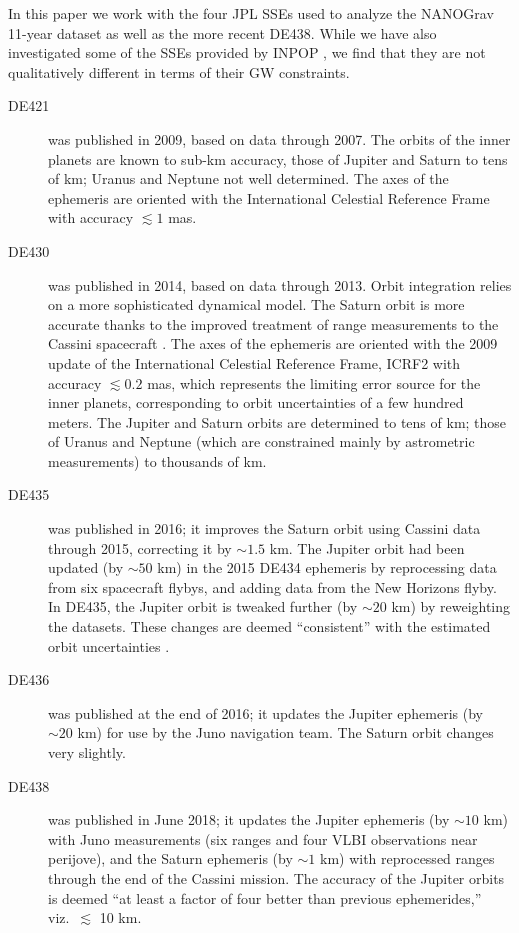 \documentclass{aastex63}
\begin{document}
In this paper we work with the four JPL SSEs used to analyze the NANOGrav 11-year dataset \citep{2018ApJ...859...47A} as well as the more recent DE438. While we have also investigated some of the SSEs provided by INPOP \citep{inpop13,inpop17}, we find that they are not qualitatively different in terms of their GW constraints.
%
\begin{description}
%
\item[DE421 \citep{2009IPNPR.178C...1F}] was published in 2009, based on data through 2007. The orbits of the inner planets are known to sub-km accuracy, those of Jupiter and Saturn to tens of km; Uranus and Neptune not well determined. The axes of the ephemeris are oriented with the International Celestial Reference Frame \citep{Ma_1998} with accuracy $\lesssim 1$ mas.
%
\item[DE430 \citep{2014IPNPR.196C...1F}] was published in 2014, based on data through 2013. Orbit integration relies on a more sophisticated dynamical model. The Saturn orbit is more accurate thanks to the improved treatment of range measurements to the Cassini spacecraft \citep{PhysRevD.89.102002}.
The axes of the ephemeris are oriented with the 2009 update of the International Celestial Reference Frame, ICRF2 \citep{2015AJ....150...58F} with accuracy $\lesssim 0.2$ mas, which represents the limiting error source for the inner planets, corresponding to orbit uncertainties of a few hundred meters. The Jupiter and Saturn orbits are determined to tens of km; those of Uranus and Neptune (which are constrained mainly by astrometric measurements) to thousands of km. 
%
\item[DE435 \citep{de435}] was published in 2016; it improves the Saturn orbit using Cassini data through 2015, correcting it by $\sim 1.5$ km. The Jupiter orbit had been updated (by $\sim 50$ km) in the 2015 DE434 ephemeris \citep{de434} by reprocessing data from six spacecraft flybys, and adding data from the New Horizons flyby. In DE435, the Jupiter orbit is tweaked further (by $\sim 20$ km) by reweighting the datasets. These changes are deemed ``consistent'' with the estimated orbit uncertainties \citep{de434,de435}.
%
\item[DE436 \citep{de436}] was published at the end of 2016; it updates the Jupiter ephemeris (by $\sim 20$ km) for use by the Juno navigation team. The Saturn orbit changes very slightly.
%
\item[DE438 \citep{de438}] was published in June 2018; it updates the Jupiter ephemeris (by $\sim 10$ km) with Juno measurements (six ranges and four VLBI observations near perijove), and the Saturn ephemeris (by $\sim 1$ km) with reprocessed ranges through the end of the Cassini mission. The accuracy of the Jupiter orbits is deemed ``at least a factor of four better than previous ephemerides,'' viz.\ $\lesssim$ 10 km.
%
\end{description}
\end{document}
